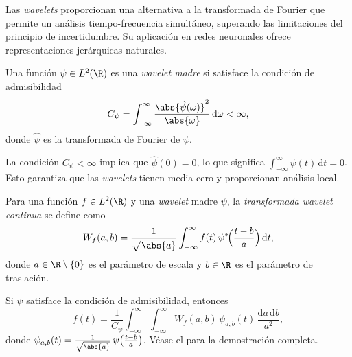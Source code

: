 Las \emph{wavelets} proporcionan una alternativa a la transformada de Fourier
que permite un an\'alisis tiempo-frecuencia simult\'aneo, superando las
limitaciones del principio de incertidumbre. Su aplicaci\'on en redes neuronales
ofrece representaciones jer\'arquicas naturales.

\begin{definition}
\label{def:grids:mother-wavelet}
Una funci\'on $\psi \in L^2(\R)$ es una \emph{wavelet madre} si satisface la
condici\'on de admisibilidad
\[
  C_\psi = \int_{-\infty}^{\infty} \frac{\abs{\hat{\psi}(\omega)}^2}{\abs{\omega}}\, \mathrm{d}\omega < \infty,
\]
donde $\hat{\psi}$ es la transformada de Fourier de $\psi$.
\end{definition}

La condici\'on $C_\psi < \infty$ implica que $\hat{\psi}(0) = 0$, lo que
significa $\int_{-\infty}^{\infty} \psi(t)\, \mathrm{d}t = 0$. Esto garantiza que
las \emph{wavelets} tienen media cero y proporcionan an\'alisis local.

\begin{definition}
\label{def:grids:cwt}
Para una funci\'on $f \in L^2(\R)$ y una \emph{wavelet} madre $\psi$, la
\emph{transformada wavelet continua} se define como
\[
  W_f(a, b) = \frac{1}{\sqrt{\abs{a}}} \int_{-\infty}^{\infty} f(t)\,
    \psi^*\!\Big(\frac{t-b}{a}\Big)\, \mathrm{d}t,
\]
donde $a \in \R\setminus\{0\}$ es el par\'ametro de escala y $b \in \R$ es el
par\'ametro de traslaci\'on.
\end{definition}

\begin{theorem}
\label{thm:grids:wavelet-reconstruction}
Si $\psi$ satisface la condici\'on de admisibilidad, entonces
\[
  f(t) = \frac{1}{C_\psi} \int_{-\infty}^{\infty} \int_{-\infty}^{\infty}
    W_f(a, b)\, \psi_{a,b}(t)\, \frac{\mathrm{d}a\, \mathrm{d}b}{a^2},
\]
donde $\psi_{a,b}(t) = \frac{1}{\sqrt{\abs{a}}}\, \psi\big(\frac{t-b}{a}\big)$.
V\'ease el  para la demostraci\'on completa.
\end{theorem}

